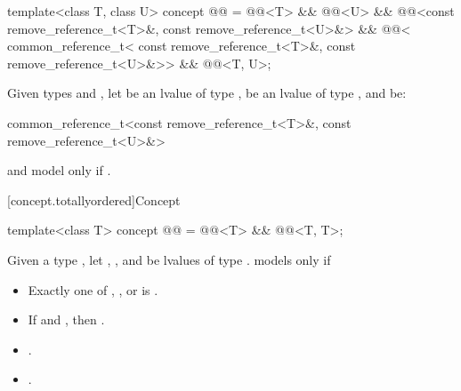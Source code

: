 \begin{itemdecl}
template<class T, class U>
  concept @@ =
    @@<T> && @@<U> &&
    @@<const remove_reference_t<T>&, const remove_reference_t<U>&> &&
    @@<
      common_reference_t<
        const remove_reference_t<T>&,
        const remove_reference_t<U>&>> &&
    @@<T, U>;
\end{itemdecl}

\begin{itemdescr}
\pnum
Given types  and ,
let  be an lvalue of type ,
 be an lvalue of type ,
and  be:
\begin{codeblock}
common_reference_t<const remove_reference_t<T>&, const remove_reference_t<U>&>
\end{codeblock}
 and  model
 only if
.
\end{itemdescr}

[concept.totallyordered]{Concept }

\begin{itemdecl}
template<class T>
  concept @@ =
    @@<T> && @@<T, T>;
\end{itemdecl}

\begin{itemdescr}
\pnum
Given a type , let , , and  be
lvalues of type .
 models  only if

\begin{itemize}
\item Exactly one of , , or
       is .
\item If  and , then
      .
\item {}.
\item {}.
\end{itemize}

\end{itemdescr}

